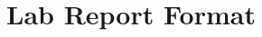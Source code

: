 \documentclass[]{msulabm}
\begin{document}
%
%
%
%
%
%
%
%
%
%
%
%
%

%
%
%
%
%
%
%
%
%
%
%
%
%
%
%
%
%
%
%
%
%
%
%
%
%
% 
% 
% 
% 
% 
% 
% 
% 
% 
% 

% 
% 
% 

\appendix


\chapter{Lab Report Format}


% 
% 
% 
% 
%
%
%
%
%
%
%
% 

% 
% 
\printbibliography
\end{document}
